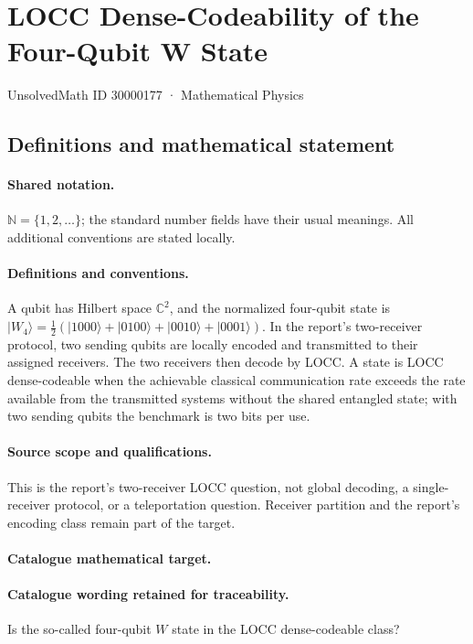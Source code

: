 \documentclass[11pt]{article}
\begin{document}
\setcounter{section}{30000176}
\section{LOCC Dense-Codeability of the Four-Qubit W State}\label{30000177}
{\small UnsolvedMath ID 30000177 · Mathematical Physics}
\subsection{Definitions and mathematical statement}

\paragraph{Shared notation.}$\mathbb N=\{1,2,\ldots\}$; the standard number fields have their usual meanings. All additional conventions are stated locally.


\paragraph{Definitions and conventions.} A qubit has Hilbert space $\mathbb C^2$, and the normalized four-qubit state is $|W_4\rangle=\tfrac12(|1000\rangle+|0100\rangle+|0010\rangle+|0001\rangle)$. In the report's two-receiver protocol, two sending qubits are locally encoded and transmitted to their assigned receivers. The two receivers then decode by LOCC. A state is LOCC dense-codeable when the achievable classical communication rate exceeds the rate available from the transmitted systems without the shared entangled state; with two sending qubits the benchmark is two bits per use.

\paragraph{Source scope and qualifications.} This is the report's two-receiver LOCC question, not global decoding, a single-receiver protocol, or a teleportation question. Receiver partition and the report's encoding class remain part of the target.

\paragraph{Catalogue mathematical target.}
\paragraph{Catalogue wording retained for traceability.}
Is the so-called four-qubit $W$ state in the LOCC dense-codeable class?
\end{document}
